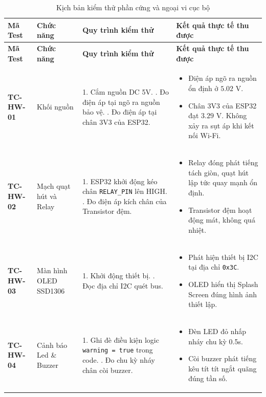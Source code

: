 \begin{longtable}{llp{5.5cm}p{5.5cm}}
\caption{Kịch bản kiểm thử phần cứng và ngoại vi cục bộ} \label{tab:testsuitehardware} \\
\toprule
\textbf{Mã Test} & \textbf{Chức năng} & \textbf{Quy trình kiểm thử} & \textbf{Kết quả thực tế thu được} \\
\midrule
\endfirsthead
\toprule
\textbf{Mã Test} & \textbf{Chức năng} & \textbf{Quy trình kiểm thử} & \textbf{Kết quả thực tế thu được} \\
\midrule
\endhead
\bottomrule
\endfoot
\bottomrule
\endlastfoot

\textbf{TC-HW-01} & Khối nguồn & 
1. Cắm nguồn DC 5V. \newline
2. Đo điện áp tại ngõ ra nguồn bảo vệ. \newline
3. Đo điện áp tại chân 3V3 của ESP32. &
\begin{itemize}
    \item Điện áp ngõ ra nguồn ổn định ở $5.02$ V.
    \item Chân 3V3 của ESP32 đạt $3.29$ V. Không xảy ra sụt áp khi kết nối Wi-Fi.
\end{itemize} \\
\midrule

\textbf{TC-HW-02} & Mạch quạt hút và Relay &
1. ESP32 khởi động kéo chân \texttt{RELAY\_PIN} lên HIGH. \newline
2. Đo điện áp kích chân của Transistor đệm. &
\begin{itemize}
    \item Relay đóng phát tiếng tách giòn, quạt hút lập tức quay mạnh ổn định.
    \item Transistor đệm hoạt động mát, không quá nhiệt.
\end{itemize} \\
\midrule

\textbf{TC-HW-03} & Màn hình OLED SSD1306 &
1. Khởi động thiết bị. \newline
2. Đọc địa chỉ I2C quét bus. &
\begin{itemize}
    \item Phát hiện thiết bị I2C tại địa chỉ \texttt{0x3C}.
    \item OLED hiển thị Splash Screen đúng hình ảnh thiết lập.
\end{itemize} \\
\midrule

\textbf{TC-HW-04} & Cảnh báo Led \& Buzzer &
1. Ghi đè điều kiện logic \texttt{warning = true} trong code. \newline
2. Đo chu kỳ nháy chân còi buzzer. &
\begin{itemize}
    \item Đèn LED đỏ nhấp nháy chu kỳ 0.5s.
    \item Còi buzzer phát tiếng kêu tít tít ngắt quãng đúng tần số.
\end{itemize} \\
\bottomrule
\end{longtable}

